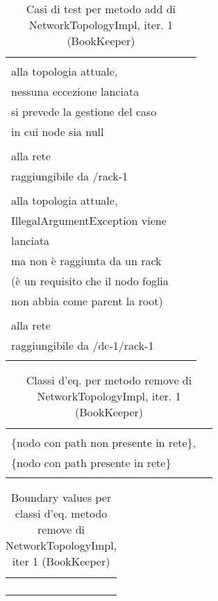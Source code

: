 \documentclass[10pt, a4paper]{article}
\newcommand{\Intmaketable}[4]{
	\begin{longtable}{#3}
	#4
	\caption{#2}
	\label{#1}
	\end{longtable}
}
\newcommand{\Intceqtable}[3]{
	\Intmaketable{#1}{#2}{|l|l|}{
	\hline
	\thead{Parametro formale} & \thead{Classi d'equivalenza} \\
	\hline
	\hline
	#3
	\hline}
}
\newcommand{\Intbvtable}[3]{
	\Intmaketable{#1}{#2}{|l|l|l|}{
	\hline
	\thead{Parametro formale} & \thead{Classe d'equivalenza} & \thead{Boundary value}\\
	\hline
	\hline
	#3
	\hline}
}
\newcommand{\Inttestctable}[3]{
	\Intmaketable{#1}{#2}{|l|l|l|}{
	\hline
	\thead{Input} & \thead{Esito atteso} & \thead{Motivazione}\\
	\hline
	\hline
	#3
	\hline}
}
\newcommand{\Intceqcaption}[4]{Classi d'eq. per metodo #1 di #2, iter. #3 (#4)}
\newcommand{\Intbvcaption}[4]{Boundary values per classi d'eq. metodo #1 di #2, iter #3 (#4)}
\newcommand{\Inttestccaption}[4]{Casi di test per metodo #1 di #2, iter. #3 (#4)}
\newcommand{\gettablelabel}[5]{table:#1:#2:#3:iter#4:proj#5}
\newcommand{\ceqtable}[5]{
	\Intceqtable{\gettablelabel{ceq}{#1}{#2}{#3}{#4}}
		{\Intceqcaption{#1}{#2}{#3}{#4}}
		{#5}
}
\newcommand{\bvtable}[5]{
	\Intbvtable{\gettablelabel{bv}{#1}{#2}{#3}{#4}}
		{\Intbvcaption{#1}{#2}{#3}{#4}}
		{#5}
}
\newcommand{\testctable}[5]{
	\Inttestctable{\gettablelabel{testc}{#1}{#2}{#3}{#4}}
		{\Inttestccaption{#1}{#2}{#3}{#4}}
		{#5}
}
\newcommand{\tcell}{\makecell[tl]}
\newcommand{\newtrow}{\\ \hline}
\def\bookkeeper{BookKeeper}
\newcommand{\ceq}[1]{\{#1\}}
\begin{document}
	\testctable{add}{NetworkTopologyImpl}{1}{\bookkeeper}{
			\tcell{null} & \tcell{Nessuna variazione rispetto\\ alla topologia attuale,\\ nessuna 
			eccezione lanciata} & \tcell{Specifica della documentazione:\\ si prevede la gestione del 
			caso\\ in cui node sia null}
		\newtrow
			\tcell{buildNode("/rack-1","bookie-1")} & \tcell{Aggiunta con successo del nodo\\ alla rete} 
			& \tcell{Il nodo è una foglia (un server bk)\\ raggiungibile da /rack-1}
		\newtrow
			\tcell{buildNode("/","bookie-2")} & \tcell{Nessuna variazione rispetto \\ alla topologia 
			attuale, \\IllegalArgumentException viene\\ lanciata} & 
			\tcell{Il nodo è una foglia (un server bk)\\ ma non è raggiunta da un rack \\
			(è un requisito che il nodo foglia\\ non abbia come parent la root) }
		\newtrow
			\tcell{buildNode("/dc-1/rack-1", "bookie-3")} & \tcell{Aggiunta con successo del nodo\\ alla 
			rete} & \tcell{Il nodo è una foglia (un server bk)\\ raggiungibile da /dc-1/rack-1}
		\newtrow
	}
	
	\ceqtable{remove}{NetworkTopologyImpl}{1}{\bookkeeper}{
			\tcell{node} & \tcell{\ceq{null}, \\ \ceq{nodo con path non presente in rete},\\ \ceq{nodo 
			con path presente in rete}}
		\newtrow
	}
	
	\pagebreak
	
	\bvtable{remove}{NetworkTopologyImpl}{1}{\bookkeeper}{
			\tcell{node} & \tcell{\ceq{null}} & \tcell{null} 
		\newtrow
			\tcell{node} & \tcell{\ceq{nodo con path non presente in rete}} & \tcell{Node("/rack-1/bookie-1")}
		\newtrow
			\tcell{node} & \tcell{\ceq{nodo con path presente in rete}} & \tcell{Node("/rack-1/bookie-2")}
		\newtrow
	}
	
\end{document}
